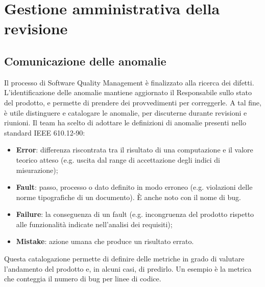 \newpage
\section{Gestione amministrativa della revisione}
\subsection{Comunicazione delle anomalie}
Il processo di Software Quality Management è finalizzato alla ricerca dei difetti. L'identificazione delle anomalie mantiene aggiornato il Responsabile sullo stato del prodotto, e permette di prendere dei provvedimenti per correggerle. A tal fine, è utile distinguere e catalogare le anomalie, per discuterne durante revisioni e riunioni. Il team ha scelto di adottare le definizioni di anomalie presenti nello standard IEEE 610.12-90:
\begin{itemize}
\item \textbf{Error}: differenza riscontrata tra il risultato di una computazione e il valore teorico atteso (e.g. uscita dal range di accettazione degli indici di misurazione);
\item \textbf{Fault}: passo, processo o dato definito in modo erroneo (e.g. violazioni delle norme tipografiche di un documento). \`E anche noto con il nome di bug.
\item \textbf{Failure}: la conseguenza di un fault (e.g. incongruenza del prodotto rispetto alle funzionalità indicate nell'analisi dei requisiti);
\item \textbf{Mistake}: azione umana che produce un risultato errato.
\end{itemize}
Questa catalogazione permette di definire delle metriche in grado di valutare l'andamento del prodotto e, in alcuni casi, di predirlo. Un esempio è la metrica che conteggia il numero di bug per linee di codice.

